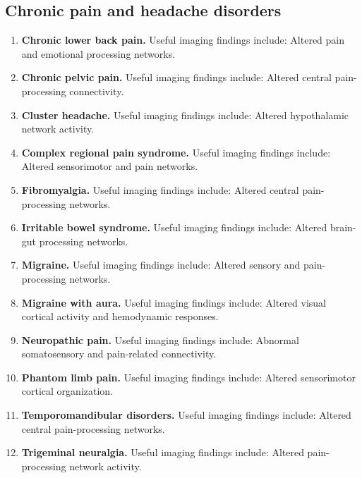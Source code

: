 \subsection{Chronic pain and headache disorders}
\begin{enumerate}[leftmargin=*,itemsep=0.45em,topsep=0.4em]
\item \textbf{Chronic lower back pain.} Useful imaging findings include: Altered pain and emotional processing networks.
\item \textbf{Chronic pelvic pain.} Useful imaging findings include: Altered central pain-processing connectivity.
\item \textbf{Cluster headache.} Useful imaging findings include: Altered hypothalamic network activity.
\item \textbf{Complex regional pain syndrome.} Useful imaging findings include: Altered sensorimotor and pain networks.
\item \textbf{Fibromyalgia.} Useful imaging findings include: Altered central pain-processing networks.
\item \textbf{Irritable bowel syndrome.} Useful imaging findings include: Altered brain-gut processing networks.
\item \textbf{Migraine.} Useful imaging findings include: Altered sensory and pain-processing networks.
\item \textbf{Migraine with aura.} Useful imaging findings include: Altered visual cortical activity and hemodynamic responses.
\item \textbf{Neuropathic pain.} Useful imaging findings include: Abnormal somatosensory and pain-related connectivity.
\item \textbf{Phantom limb pain.} Useful imaging findings include: Altered sensorimotor cortical organization.
\item \textbf{Temporomandibular disorders.} Useful imaging findings include: Altered central pain-processing networks.
\item \textbf{Trigeminal neuralgia.} Useful imaging findings include: Altered pain-processing network activity.
\end{enumerate}

